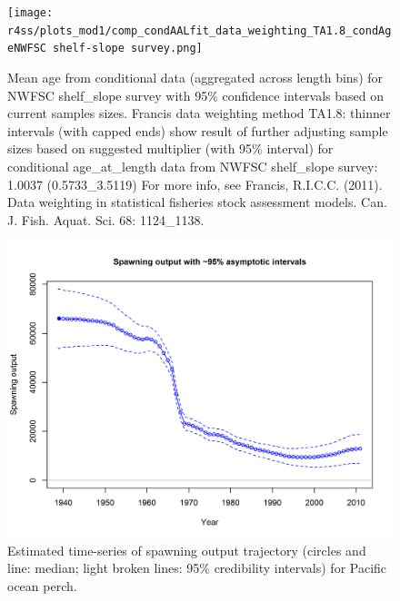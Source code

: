 \documentclass[12pt,]{article}
\begin{document}
\begin{figure}
\centering
\texttt{[image: r4ss/plots\_mod1/comp\_condAALfit\_data\_weighting\_TA1.8\_condAgeNWFSC shelf-slope survey.png]}
\caption{Mean age from conditional data (aggregated across length bins)
for NWFSC shelf\_slope survey with 95\% confidence intervals based on
current samples sizes. Francis data weighting method TA1.8: thinner
intervals (with capped ends) show result of further adjusting sample
sizes based on suggested multiplier (with 95\% interval) for conditional
age\_at\_length data from NWFSC shelf\_slope survey: 1.0037
(0.5733\_3.5119) For more info, see Francis, R.I.C.C. (2011). Data
weighting in statistical fisheries stock assessment models. Can. J.
Fish. Aquat. Sci. 68: 1124\_1138. \label{fig:weighting_nwfsccombo}}
\end{figure}

\FloatBarrier

\begin{figure}
\centering
\includegraphics{r4ss/plots_mod1/ts7_Spawning_output_with_95_asymptotic_intervals_intervals.png}
\caption{Estimated time-series of spawning output trajectory (circles
and line: median; light broken lines: 95\% credibility intervals) for
Pacific ocean perch. \label{fig:ssb}}
\end{figure}

\FloatBarrier
\end{document}
